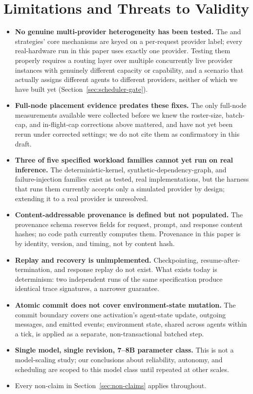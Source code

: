 \section{Limitations and Threats to Validity}
\label{sec:limitations}

\begin{itemize}
  \item \textbf{No genuine multi-provider heterogeneity has been tested.} The \CapabilityAware{} and \QueueAware{} strategies' core mechanisms are keyed on a per-request provider label; every real-hardware run in this paper uses exactly one provider. Testing them properly requires a routing layer over multiple concurrently live provider instances with genuinely different capacity or capability, and a scenario that actually assigns different agents to different providers, neither of which we have built yet (Section~\ref{sec:scheduler-gate}).
  \item \textbf{Full-node placement evidence predates these fixes.} The only full-node measurements available were collected before we knew the roster-size, batch-cap, and in-flight-cap corrections above mattered, and have not yet been rerun under corrected settings; we do not cite them as confirmatory in this draft.
  \item \textbf{Three of five specified workload families cannot yet run on real inference.} The deterministic-kernel, synthetic-dependency-graph, and failure-injection families exist as tested, real implementations, but the harness that runs them currently accepts only a simulated provider by design; extending it to a real provider is unresolved.
  \item \textbf{Content-addressable provenance is defined but not populated.} The provenance schema reserves fields for request, prompt, and response content hashes; no code path currently computes them. Provenance in this paper is by identity, version, and timing, not by content hash.
  \item \textbf{Replay and recovery is unimplemented.} Checkpointing, resume-after-termination, and response replay do not exist. What exists today is determinism: two independent runs of the same specification produce identical trace signatures, a narrower guarantee.
  \item \textbf{Atomic commit does not cover environment-state mutation.} The commit boundary covers one activation's agent-state update, outgoing messages, and emitted events; environment state, shared across agents within a tick, is applied as a separate, non-transactional batched step.
  \item \textbf{Single model, single revision, 7--8B parameter class.} This is not a model-scaling study; our conclusions about reliability, autonomy, and scheduling are scoped to this model class until repeated at other scales.
  \item Every non-claim in Section~\ref{sec:non-claims} applies throughout.
\end{itemize}
